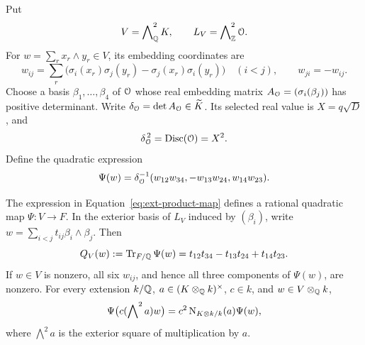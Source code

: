Put
\[
 V=\bigwedge\nolimits^2_{\mathbb Q}K,\qquad
 L_V=\bigwedge\nolimits^2_{\mathbb Z}\mathcal O.
\]
For \(w=\sum_r x_r\wedge y_r\in V\), its embedding coordinates are
\[
 w_{ij}=\sum_r
 \bigl(\sigma_i(x_r)\sigma_j(y_r)-\sigma_j(x_r)\sigma_i(y_r)\bigr)
 \quad(i<j),\qquad w_{ji}=-w_{ij}.
\]
Choose a basis \(\beta_1,\ldots,\beta_4\) of \(\mathcal O\) whose real embedding
matrix \(A_{\mathcal O}=(\sigma_i(\beta_j))\) has positive determinant.  Write
\(\delta_{\mathcal O}=\det A_{\mathcal O}\in\widetilde K\).  Its selected real value is
\(X=q\sqrt D\), and
\begin{equation}
 \delta_{\mathcal O}^{\,2}=\operatorname{Disc}(\mathcal O)=X^2.
 \label{eq:ext-embedding-determinant}
\end{equation}
Define the quadratic expression
\begin{equation}
 \Psi(w)=\delta_{\mathcal O}^{-1}
       (w_{12}w_{34},-w_{13}w_{24},w_{14}w_{23}).
 \label{eq:ext-product-map}
\end{equation}

\begin{lemma}
\label{lem:ext-products}
The expression in Equation~\eqref{eq:ext-product-map} defines a rational
quadratic map \(\Psi:V\to F\).  In the exterior basis of \(L_V\) induced
by \((\beta_i)\), write \(w=\sum_{i<j}t_{ij}\beta_i\wedge\beta_j\).
Then
\begin{equation}
 Q_V(w):=\operatorname{Tr}_{F/\mathbb Q}\Psi(w)
       =t_{12}t_{34}-t_{13}t_{24}+t_{14}t_{23}.
 \label{eq:ext-integral-form}
\end{equation}
If \(w\in V\) is nonzero, all six \(w_{ij}\), and hence all three
components of \(\Psi(w)\), are nonzero.  For every extension \(k/\mathbb Q\),
\(a\in(K\otimes_\mathbb Q k)^\times\), \(c\in k\), and \(w\in V\otimes_\mathbb Q k\),
\begin{equation}
 \Psi\bigl(c(\bigwedge\nolimits^2 a)w\bigr)
       =c^2\operatorname{N}_{K\otimes k/k}(a)\Psi(w),
 \label{eq:ext-covariance}
\end{equation}
where \(\bigwedge^2a\) is the exterior square of multiplication by \(a\).
\end{lemma}

